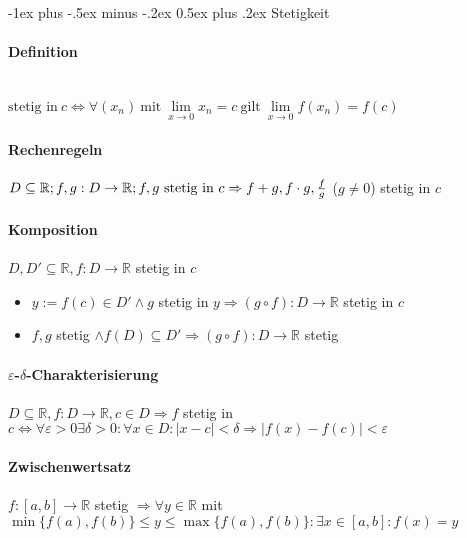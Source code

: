 \documentclass[paper=a3,paper=landscape, fontsize=9pt, DIV=30]{scrartcl}
\makeatletter
\newcommand{\real}{{\mathbb{R}}}
\renewcommand{\section}{\@startsection{section}{1}{0mm}%
  {-1ex plus -.5ex minus -.2ex}%
  {0.5ex plus .2ex}%
  {\color{blue}\normalfont\large\bfseries}}
\makeatother
\begin{document}
\begin{multicols*}{4}
  \section{Stetigkeit}

  \paragraph{Definition}\hspace{0pt} \\
  $\text{stetig in}\ c \Leftrightarrow \forall (x_n) \ \text{mit}\ \lim\limits_{x \rightarrow 0}x_n = c \ \text{gilt}\ \lim\limits_{x \rightarrow 0}f(x_n)=f(c)$

  \paragraph{Rechenregeln}
  $D \subseteq \real;f,g: D \rightarrow \real;f,g ~\text{stetig in}\ c \\ \Rightarrow f+g, f \cdot g,\frac{f}{g}$ ($g \neq 0$) stetig in $c$


  \paragraph{Komposition}
  $D,D' \subseteq \real, f:D \rightarrow \real$ stetig in $c$
  \begin{itemize}
  \item $y := f(c) \in D' \wedge g $ stetig in $y \Rightarrow (g \circ f): D \rightarrow \real$ stetig in $c$
  \item $f,g$ stetig $\wedge f(D) \subseteq D' \Rightarrow (g \circ f): D \rightarrow \real$ stetig
  \end{itemize}


  \paragraph{$\varepsilon$-$\delta$-Charakterisierung}
  $D \subseteq \real, f: D \rightarrow \real, c \in D \Rightarrow f$ stetig in $c \Leftrightarrow \forall \varepsilon > 0 \exists \delta > 0: \forall x \in D: \lvert x - c \rvert < \delta \Rightarrow \lvert f(x)-f(c)\rvert < \varepsilon$


  \paragraph{Zwischenwertsatz}
  $f:[a,b] \rightarrow \real$ stetig $\Rightarrow \forall y \in \real$ mit $ \min\{f(a),f(b)\} \leq y \leq \max\{f(a), f(b)\}: \exists x \in [a,b]: f(x)=y$



\end{multicols*}
\end{document}
